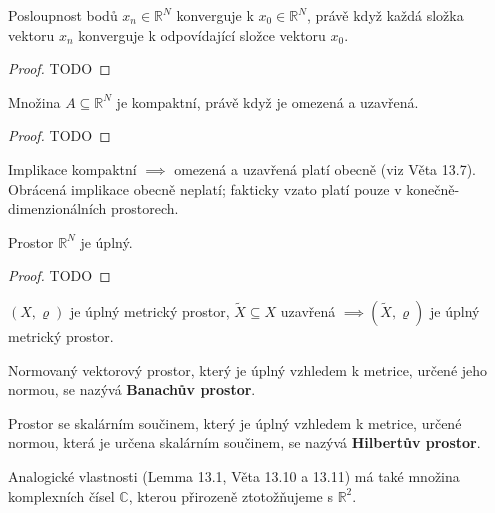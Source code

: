 \begin{lemma}
Posloupnost bodů $x_n \in \mathbb R^N$ konverguje k $x_0 \in \mathbb R^N$, právě když každá složka vektoru $x_n$ konverguje k odpovídající složce vektoru $x_0$.
\end{lemma}

\begin{proof}
  TODO
\end{proof}

\begin{veta}
Množina $A \subseteq \mathbb R^N$ je kompaktní, právě když je omezená a uzavřená.
\end{veta}

\begin{proof}
  TODO
\end{proof}

\begin{poznamka}
Implikace kompaktní $\implies$ omezená a uzavřená platí obecně (viz Věta 13.7). Obrácená implikace obecně neplatí; fakticky vzato platí pouze v konečně-dimenzionálních prostorech.
\end{poznamka}

\begin{veta}
Prostor $\mathbb R^N$ je úplný.
\end{veta}

\begin{proof}
  TODO
\end{proof}

\begin{poznamka}
  $(X, \varrho)$ je úplný metrický prostor, $\tilde{X} \subseteq X$ uzavřená $\implies (\tilde{X}, \varrho)$ je úplný metrický prostor.
\end{poznamka}

\begin{definice}
Normovaný vektorový prostor, který je úplný vzhledem k metrice, určené jeho normou, se nazývá \textbf{Banachův prostor}.

Prostor se skalárním součinem, který je úplný vzhledem k metrice, určené normou, která je určena skalárním součinem, se nazývá \textbf{Hilbertův prostor}.
\end{definice}

\begin{poznamka}
Analogické vlastnosti (Lemma 13.1, Věta 13.10 a 13.11) má také množina komplexních čísel $\mathbb C$, kterou přirozeně ztotožňujeme s $\mathbb R^2$.
\end{poznamka}
